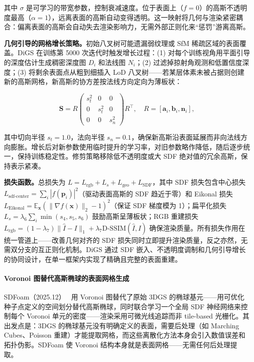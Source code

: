 其中 $\sigma$ 是可学习的带宽参数，控制衰减速度。位于表面上（$f{=}0$）的高斯不透明度最高（$\alpha{=}1$），远离表面的高斯自动变得透明。这一映射将几何与渲染紧密耦合：偏离表面的高斯会自动失去渲染影响力，无需外部正则化来“惩罚”游离高斯。

\textbf{几何引导的网格增长策略。}初始八叉树可能遗漏弱纹理或 SfM 稀疏区域的表面覆盖。DiGS 在训练第 5000 次迭代时触发增长过程：(1) 对每个训练视角用平面引导的深度估计生成稠密深度图 $D_i$ 和法线图 $N_i$；(2) 过滤掉掠射角观测和低置信度深度；(3) 将剩余表面点从粗到细插入 LoD 八叉树——若某层体素未被占据则创建新的高斯网格，新高斯的协方差按法线方向定向为薄板状：

\begin{equation}
\mathbf{S} = R \begin{pmatrix} s_t^2 & 0 & 0 \\ 0 & s_t^2 & 0 \\ 0 & 0 & s_n^2 \end{pmatrix} R^\top, \quad R = [\mathbf{a}_i, \mathbf{b}_i, \mathbf{n}_i],
\end{equation}

其中切向半径 $s_t{=}1.0$，法向半径 $s_n{=}0.1$，确保新高斯沿表面延展而非向法线方向膨胀。增长后对新参数使用临时提升的学习率，对旧参数略作降低，随后逐步统一，保持训练稳定性。修剪策略移除低不透明度或大 SDF 绝对值的冗余高斯，保持表示紧凑。

\textbf{损失函数。}总损失为 $L = L_{\text{rgb}} + L_s + L_{\text{geo}} + L_{\text{SDF}}$，其中 SDF 损失包含中心损失 $L_{\text{sdf-center}} = \sum_i |f(\mathbf{p}_i)|^2$（驱动表面高斯的 SDF 趋近于零）和 Eikonal 损失 $L_{\text{Eikonal}} = \mathbb{E}_{\mathbf{x}}(\|\nabla f(\mathbf{x})\|_2 - 1)^2$（保证 SDF 梯度模为 1）；扁平化损失 $L_s = \lambda_6 \sum_i \min(s_4, s_5, s_6)$ 鼓励高斯呈薄板状；RGB 重建损失 $L_{\text{rgb}} = (1{-}\lambda_7)\|\hat{I} - I\|_1 + \lambda_7 \text{D-SSIM}(\hat{I}, I)$ 确保渲染质量。所有损失作用在统一管道上——改善几何对齐的 SDF 损失同时立即提升渲染质量，反之亦然，无需双分支的互正则化机制。DiGS 通过 SDF 嵌入、不透明度调制和几何引导增长的协同设计，在单一框架内实现了精确且完整的表面重建。

\paragraph{Voronoi 图替代高斯椭球的表面网格生成}

SDFoam（2025.12）~\cite{2512_16706} 用 Voronoi 图替代了原始 3DGS 的椭球基元——用可优化种子点定义的空间划分替代高斯椭球，同时联合学习一个全局 SDF 神经网络来控制每个 Voronoi 单元的密度——渲染采用可微光线追踪而非 tile-based 光栅化。其出发点是：3DGS 的椭球基元没有明确定义的表面，需要后处理（如 Marching Cubes、Poisson 重建）才能提取网格，而这些离散化方法本身会引入数值误差和拓扑伪影。SDFoam 使 Voronoi 结构本身就是表面网格——无需任何后处理提取。


